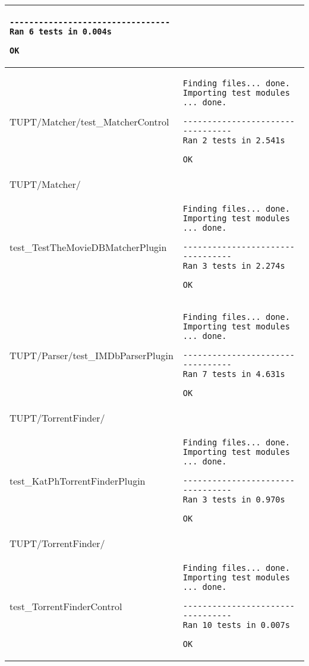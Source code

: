 \begin{center}
\begin{longtable}{| p{} | p{} |}
\begin{verbatim}
---------------------------------
Ran 6 tests in 0.004s

OK
\end{verbatim}\\ \hline
    TUPT/Matcher/test\_MatcherControl & 
\begin{verbatim}
Finding files... done.
Importing test modules ... done.

---------------------------------
Ran 2 tests in 2.541s

OK
\end{verbatim}\\ \hline
    \small{TUPT/Matcher/} \\ {test\_TestTheMovieDBMatcherPlugin} & 
\begin{verbatim}
Finding files... done.
Importing test modules ... done.

---------------------------------
Ran 3 tests in 2.274s

OK
\end{verbatim}\\ \hline
    TUPT/Parser/test\_IMDbParserPlugin & 
\begin{verbatim}
Finding files... done.
Importing test modules ... done.

---------------------------------
Ran 7 tests in 4.631s

OK
\end{verbatim}\\ \hline
    \small{TUPT/TorrentFinder/} \\ {test\_KatPhTorrentFinderPlugin} & 
\begin{verbatim}
Finding files... done.
Importing test modules ... done.

---------------------------------
Ran 3 tests in 0.970s

OK
\end{verbatim}\\ \hline
    \small{TUPT/TorrentFinder/} \\ {test\_TorrentFinderControl} & 
\begin{verbatim}
Finding files... done.
Importing test modules ... done.

---------------------------------
Ran 10 tests in 0.007s

OK
\end{verbatim}\\
\end{longtable}
\end{center}

